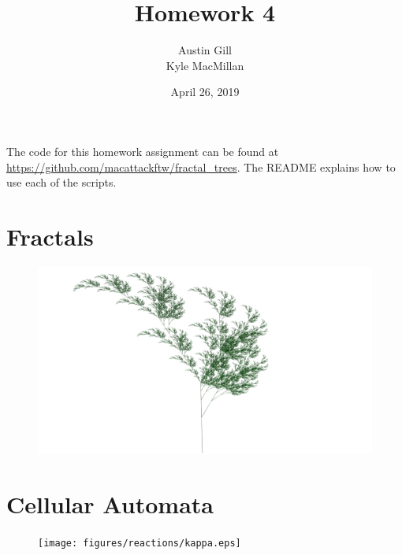\documentclass[12pt]{article}
\title{Homework 4}
\author{Austin Gill \\ Kyle MacMillan}
\date{April 26, 2019}
\begin{document}
\maketitle
\begingroup
\hypersetup{linkcolor=black}
\tableofcontents
\endgroup

The code for this homework assignment can be found at \url{https://github.com/macattackftw/fractal_trees}.
The README explains how to use each of the scripts.

\newpage

\part{Fractals}
\vfill
\begin{figure}[H]
    \centering
    \includegraphics[width=\textwidth]{figures/L-systems/a.png}
\end{figure}




\part{Cellular Automata}
\begin{figure}[H]
    \centering
    \texttt{[image: figures/reactions/kappa.eps]}
\end{figure}


\end{document}
